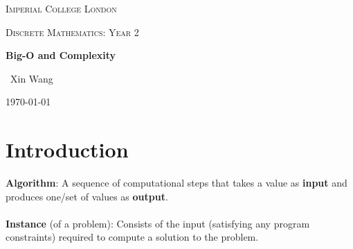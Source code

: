 \documentclass[10pt,a4paper]{article}
\begin{document}

\begin{titlepage}
	\centering
	{\scshape\LARGE Imperial College London \par}
	\vspace{1cm}
    {\scshape\Large Discrete Mathematics: Year 2\par}
    \vspace{1.5cm}
	{\huge\bfseries Big-O and Complexity\par}
	\vspace{2cm}
	{\Large\ Xin Wang }
	\vfill
	{\large \today\par}
\end{titlepage}


\begin{abstract}
    Algorithms are at the heart of computing which is a significant area in EIE. The design and
    analysis of algorithms are essential skills to an engineer and there several established design
    and analysis strategies. \par 

    Understanding "Time Complexity" is important in order to write fast code. Time Complexity is the
    computational complexity that describes the amount of time it takes to run an algorithms.
\end{abstract}


\tableofcontents
\pagebreak

\section{Introduction}

\begin{tcolorbox}[breakable,colback=white]
\textbf{Algorithm}: A sequence of computational steps that takes a value as \textbf{input}
and produces one/set of values as \textbf{output}.
\\
\\
\textbf{Instance} (of a problem): Consists of the input (satisfying any program constraints)
required to compute a solution to the problem.
\end{tcolorbox}
\end{document}
